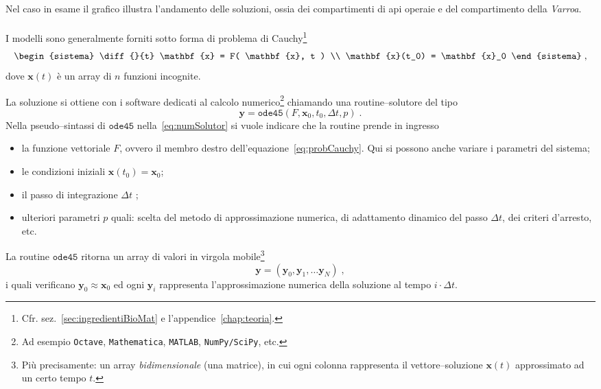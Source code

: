 Nel caso in esame il grafico illustra l'andamento delle soluzioni, ossia dei compartimenti di api operaie e del
compartimento della \emph{Varroa}.

\paragraph{}
I modelli sono generalmente forniti sotto forma di problema di Cauchy\footnote{Cfr. sez.~\ref{sec:ingredientiBioMat} e
l'appendice~\ref{chap:teoria}.}
\begin{equation}
\begin{sistema}
\diff{}{t} \mathbf{x} = F( \mathbf{x}, t )  \\
\mathbf{x}(t_0) = \mathbf{x}_0
\end{sistema}
\; ,
\label{eq:probCauchy}
\end{equation}
dove $\mathbf{x}(t)$ è un array di $n$ funzioni incognite.

La soluzione si ottiene con i software dedicati al calcolo numerico\footnote{Ad esempio \texttt{Octave},
\texttt{Mathematica}, \texttt{MATLAB}, \texttt{NumPy/SciPy}, etc.} chiamando una routine--solutore del tipo
\begin{equation}
\mathbf{y} = \mathtt{ode45} ( F, \mathbf{x}_0, t_0, \Delta t, p) \; .
\label{eq:numSolutor}
\end{equation}
Nella pseudo--sintassi di $\mathtt{ode45}$ nella~\eqref{eq:numSolutor} si vuole indicare che la routine prende in ingresso
\begin{itemize}
    \item la funzione vettoriale $F$, ovvero il membro destro dell'equazione~\eqref{eq:probCauchy}.
        Qui si possono anche variare i parametri del sistema;
    \item le condizioni iniziali $\mathbf{x} (t_0) = \mathbf{x}_0$;
    \item il passo di integrazione $\Delta t$ ;
    \item ulteriori parametri $p$ quali: scelta del metodo di approssimazione numerica, di adattamento dinamico del passo
        $\Delta t$, dei criteri d'arresto, etc.
\end{itemize}

La routine $\mathtt{ode45}$ ritorna un array di valori in virgola mobile\footnote{Più
precisamente: un array \emph{bidimensionale} (una matrice), in cui ogni colonna rappresenta
il vettore--soluzione $\mathbf{x}(t)$ approssimato ad un certo tempo $t$.}
\begin{equation}
\mathbf{y} = \left( \mathbf{y}_0, \mathbf{y}_1, \dots \mathbf{y}_N \right) \; ,
\label{eq:approxSol}
\end{equation}
i quali verificano $\mathbf{y}_0 \approx \mathbf{x}_0$ ed ogni $\mathbf{y}_i$ rappresenta l'approssimazione
numerica della soluzione al tempo $i \cdot \Delta t$.

